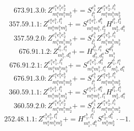 \documentclass[letterpaper,10pt,fleqn,leqno,onecolumn]{article}
\begin{document}
\begin{equation} \;\;\;\;\;\;  673.91.3.0: Z^{e_{1}^{a}e_{1}^{b}e_{2}^{b}}_{m_{1}^{a}m_{1}^{b}m_{2}^{b}}+=S^{e_{1}^{b}}_{l_{1}^{b}}Z^{e_{1}^{a}e_{2}^{b},l_{1}^{b}}_{m_{1}^{a}m_{1}^{b}m_{2}^{b}} \end{equation}
\begin{equation} \;\;\;\;\;\;  357.59.1.1: Z^{e_{1}^{a}e_{1}^{b},l_{1}^{b}}_{m_{1}^{a}m_{1}^{b}m_{2}^{b}}+=S^{e_{1}^{a}e_{1}^{b},d_{1}^{b}}_{m_{1}^{a}m_{1}^{b},l_{2}^{b}}H^{l_{1}^{b},l_{2}^{b}}_{m_{2}^{b},d_{1}^{b}} \end{equation}
\begin{equation} \;\;\;\;\;\;  357.59.2.0: Z^{e_{1}^{a}e_{1}^{b}e_{2}^{b}}_{m_{1}^{a}m_{1}^{b}m_{2}^{b}}+=S^{e_{1}^{b}}_{l_{1}^{b}}Z^{e_{1}^{a}e_{2}^{b},l_{1}^{b}}_{m_{1}^{a}m_{1}^{b}m_{2}^{b}} \end{equation}
\begin{equation} \;\;\;\;\;\;  676.91.1.2: Z^{l_{1}^{b},l_{1}^{a}}_{m_{1}^{b},d_{1}^{a}}+=H^{l_{1}^{b},l_{1}^{a}}_{d_{1}^{b},d_{1}^{a}}S^{d_{1}^{b}}_{m_{1}^{b}} \end{equation}
\begin{equation} \;\;\;\;\;\;  676.91.2.1: Z^{e_{1}^{a}e_{1}^{b},l_{1}^{b}}_{m_{1}^{a}m_{1}^{b}m_{2}^{b}}+=S^{e_{1}^{a}e_{1}^{b},d_{1}^{a}}_{m_{1}^{a}m_{1}^{b},l_{1}^{a}}Z^{l_{1}^{b},l_{1}^{a}}_{m_{2}^{b},d_{1}^{a}} \end{equation}
\begin{equation} \;\;\;\;\;\;  676.91.3.0: Z^{e_{1}^{a}e_{1}^{b}e_{2}^{b}}_{m_{1}^{a}m_{1}^{b}m_{2}^{b}}+=S^{e_{1}^{b}}_{l_{1}^{b}}Z^{e_{1}^{a}e_{2}^{b},l_{1}^{b}}_{m_{1}^{a}m_{1}^{b}m_{2}^{b}} \end{equation}
\begin{equation} \;\;\;\;\;\;  360.59.1.1: Z^{e_{1}^{a}e_{1}^{b},l_{1}^{b}}_{m_{1}^{a}m_{1}^{b}m_{2}^{b}}+=S^{e_{1}^{a}e_{1}^{b},d_{1}^{a}}_{m_{1}^{a}m_{1}^{b},l_{1}^{a}}H^{l_{1}^{b},l_{1}^{a}}_{m_{2}^{b},d_{1}^{a}} \end{equation}
\begin{equation} \;\;\;\;\;\;  360.59.2.0: Z^{e_{1}^{a}e_{1}^{b}e_{2}^{b}}_{m_{1}^{a}m_{1}^{b}m_{2}^{b}}+=S^{e_{1}^{b}}_{l_{1}^{b}}Z^{e_{1}^{a}e_{2}^{b},l_{1}^{b}}_{m_{1}^{a}m_{1}^{b}m_{2}^{b}} \end{equation}
\begin{equation} \;\;\;\;\;\;  252.48.1.1: Z^{e_{1}^{b}e_{2}^{b},l_{1}^{a}}_{m_{1}^{a}m_{1}^{b}m_{2}^{b}}+=H^{e_{1}^{b},l_{1}^{a}}_{m_{1}^{a},d_{1}^{b}}S^{e_{2}^{b},d_{1}^{b}}_{m_{1}^{b}m_{2}^{b}}\cdot -1. \end{equation}
\end{document}
